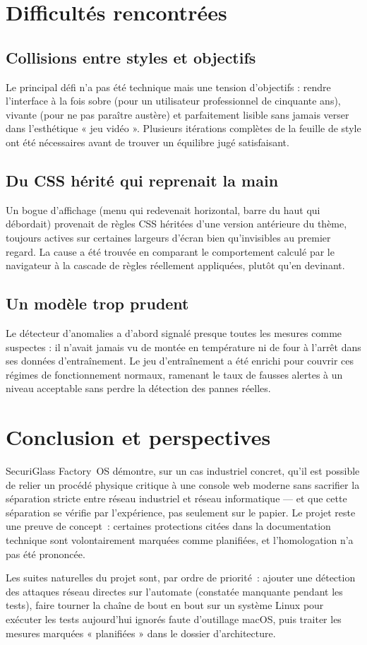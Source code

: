 \documentclass[11pt,a4paper]{report}
\begin{document}
\chapter{Difficultés rencontrées}

\section{Collisions entre styles et objectifs}
Le principal défi n'a pas été technique mais une tension d'objectifs : rendre
l'interface à la fois sobre (pour un utilisateur professionnel de cinquante
ans), vivante (pour ne pas paraître austère) et parfaitement lisible sans
jamais verser dans l'esthétique « jeu vidéo ». Plusieurs itérations complètes de
la feuille de style ont été nécessaires avant de trouver un équilibre jugé
satisfaisant.

\section{Du CSS hérité qui reprenait la main}
Un bogue d'affichage (menu qui redevenait horizontal, barre du haut qui
débordait) provenait de règles CSS héritées d'une version antérieure du thème,
toujours actives sur certaines largeurs d'écran bien qu'invisibles au premier
regard. La cause a été trouvée en comparant le comportement calculé par le
navigateur à la cascade de règles réellement appliquées, plutôt qu'en devinant.

\section{Un modèle trop prudent}
Le détecteur d'anomalies a d'abord signalé presque toutes les mesures comme
suspectes : il n'avait jamais vu de montée en température ni de four à l'arrêt
dans ses données d'entraînement. Le jeu d'entraînement a été enrichi pour
couvrir ces régimes de fonctionnement normaux, ramenant le taux de fausses
alertes à un niveau acceptable sans perdre la détection des pannes réelles.

\chapter{Conclusion et perspectives}

SecuriGlass Factory~OS démontre, sur un cas industriel concret, qu'il est
possible de relier un procédé physique critique à une console web moderne sans
sacrifier la séparation stricte entre réseau industriel et réseau
informatique — et que cette séparation se vérifie par l'expérience, pas
seulement sur le papier. Le projet reste une preuve de concept~: certaines
protections citées dans la documentation technique sont volontairement
marquées comme planifiées, et l'homologation n'a pas été prononcée.

Les suites naturelles du projet sont, par ordre de priorité~: ajouter une
détection des attaques réseau directes sur l'automate (constatée manquante
pendant les tests), faire tourner la chaîne de bout en bout sur un système
Linux pour exécuter les tests aujourd'hui ignorés faute d'outillage macOS, puis
traiter les mesures marquées « planifiées » dans le dossier d'architecture.
\end{document}
